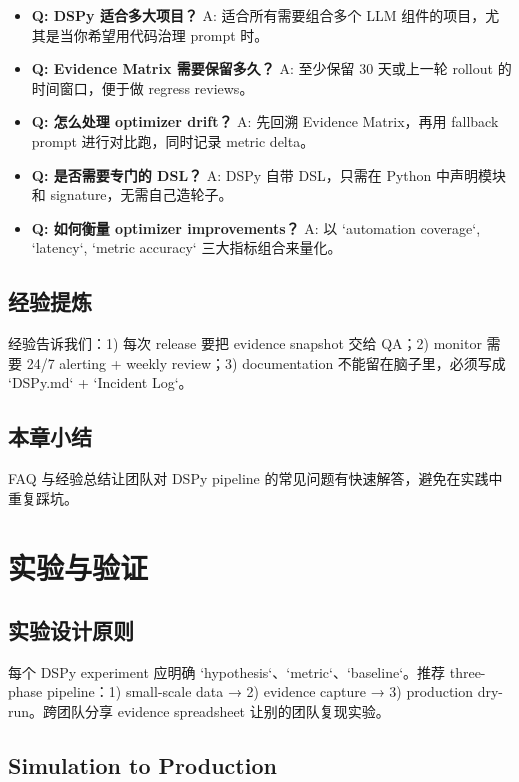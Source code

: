 \documentclass[a4paper]{article}
\begin{document}
\begin{itemize}
    \item \textbf{Q: DSPy 适合多大项目？} A: 适合所有需要组合多个 LLM 组件的项目，尤其是当你希望用代码治理 prompt 时。
    \item \textbf{Q: Evidence Matrix 需要保留多久？} A: 至少保留 30 天或上一轮 rollout 的时间窗口，便于做 regress reviews。
    \item \textbf{Q: 怎么处理 optimizer drift？} A: 先回溯 Evidence Matrix，再用 fallback prompt 进行对比跑，同时记录 metric delta。
    \item \textbf{Q: 是否需要专门的 DSL？} A: DSPy 自带 DSL，只需在 Python 中声明模块和 signature，无需自己造轮子。
    \item \textbf{Q: 如何衡量 optimizer improvements？} A: 以 `automation coverage`, `latency`, `metric accuracy` 三大指标组合来量化。
\end{itemize}

\subsection{经验提炼}

经验告诉我们：1) 每次 release 要把 evidence snapshot 交给 QA；2) monitor 需要 24/7 alerting + weekly review；3) documentation 不能留在脑子里，必须写成 `DSPy.md` + `Incident Log`。

\subsection{本章小结}

FAQ 与经验总结让团队对 DSPy pipeline 的常见问题有快速解答，避免在实践中重复踩坑。

\section{实验与验证}

\subsection{实验设计原则}

每个 DSPy experiment 应明确 `hypothesis`、`metric`、`baseline`。推荐 three-phase pipeline：1) small-scale data → 2) evidence capture → 3) production dry-run。跨团队分享 evidence spreadsheet 让别的团队复现实验。

\subsection{Simulation to Production}
\end{document}
